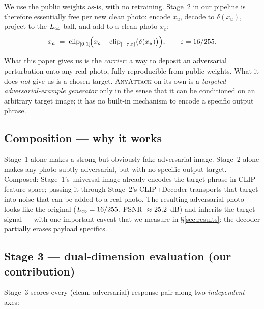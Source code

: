 We use the public weights as-is, with no retraining. Stage~2 in our pipeline is therefore essentially free per new clean photo: encode $x_u$, decode to $\delta(x_u)$, project to the $L_{\infty}$ ball, and add to a clean photo $x_c$:
\begin{equation}
  x_a \;=\; \mathrm{clip}_{[0,1]}\!\Bigl(x_c + \mathrm{clip}_{[-\varepsilon,\varepsilon]}\bigl(\delta(x_u)\bigr)\Bigr), \qquad \varepsilon = 16/255.
\end{equation}

What this paper gives us is the \emph{carrier}: a way to deposit an adversarial perturbation onto any real photo, fully reproducible from public weights. What it does \emph{not} give us is a chosen target. \textsc{AnyAttack} on its own is a \emph{targeted-adversarial-example generator} only in the sense that it can be conditioned on an arbitrary target image; it has no built-in mechanism to encode a specific output phrase.

\subsection{Composition --- why it works}

Stage~1 alone makes a strong but obviously-fake adversarial image. Stage~2 alone makes any photo subtly adversarial, but with no specific output target. Composed: Stage~1's universal image already encodes the target phrase in CLIP feature space; passing it through Stage~2's CLIP+Decoder transports that target into noise that can be added to a real photo. The resulting adversarial photo looks like the original ($L_{\infty} = 16/255$, PSNR $\approx 25.2$~dB) and inherits the target signal --- with one important caveat that we measure in \S\ref{sec:results}: the decoder partially erases payload specifics.

\subsection{Stage 3 --- dual-dimension evaluation (our contribution)}

Stage~3 scores every (clean, adversarial) response pair along two \emph{independent} axes:

